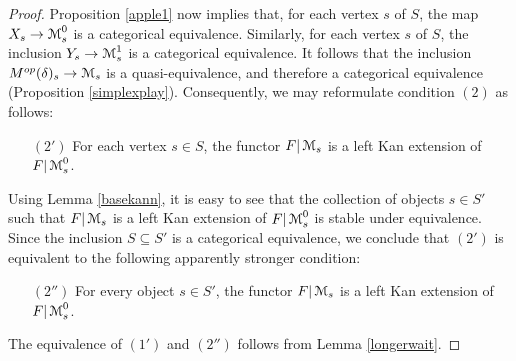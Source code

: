 \begin{proof}
Proposition \ref{apple1} now implies that, for each
vertex $s$ of $S$, the map $X_{s} \rightarrow \operatorname{\mathcal{M}}^{0}_{s}$ is a categorical equivalence.
Similarly, for each vertex $s$ of $S$, the inclusion $Y_{s} \rightarrow \operatorname{\mathcal{M}}^{1}_{s}$ is a categorical equivalence. It follows that the inclusion $M^{op}(\delta)_{s} \rightarrow \operatorname{\mathcal{M}}_{s}$ is a
quasi-equivalence, and therefore a categorical equivalence (Proposition \ref{simplexplay}). 
Consequently, we may reformulate condition $(2)$ as follows:

\begin{itemize}
\item[$(2')$] For each vertex $s \in S$, the functor $F| \operatorname{\mathcal{M}}_{s}$ is a left Kan extension of
$F| \operatorname{\mathcal{M}}^{0}_{s}$. 
\end{itemize}

Using Lemma \ref{basekann}, it is easy to see that the collection of objects $s \in S'$ such that
$F| \operatorname{\mathcal{M}}_{s}$ is a left Kan extension of $F| \operatorname{\mathcal{M}}^{0}_{s}$ is stable under equivalence. Since
the inclusion $S \subseteq S'$ is a categorical equivalence, we conclude that $(2')$ is equivalent to the following apparently stronger condition:

\begin{itemize}
\item[$(2'')$] For every object $s \in S'$, the functor $F| \operatorname{\mathcal{M}}_{s}$ is a left Kan extension of
$F| \operatorname{\mathcal{M}}^{0}_{s}$. 
\end{itemize}

The equivalence of $(1')$ and $(2'')$ follows from Lemma \ref{longerwait}. 
\end{proof}



